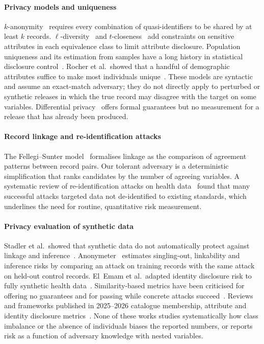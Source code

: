 \documentclass[preprint,12pt]{elsarticle}
\begin{document}
\paragraph{Privacy models and uniqueness}
$k$-anonymity~\cite{sweeney2002kanon} requires every combination of quasi-identifiers to be shared by at least $k$ records. $\ell$-diversity~\cite{machanavajjhala2007ldiv} and $t$-closeness~\cite{li2007tcloseness} add constraints on sensitive attributes in each equivalence class to limit attribute disclosure. Population uniqueness and its estimation from samples have a long history in statistical disclosure control~\cite{skinner2002measure}. Rocher et al.\ showed that a handful of demographic attributes suffice to make most individuals unique~\cite{rocher2019estimating}. These models are syntactic and assume an exact-match adversary; they do not directly apply to perturbed or synthetic releases in which the true record may disagree with the target on some variables. Differential privacy~\cite{dwork2006dp} offers formal guarantees but no measurement for a release that has already been produced.

\paragraph{Record linkage and re-identification attacks}
The Fellegi--Sunter model~\cite{fellegi1969linkage} formalises linkage as the comparison of agreement patterns between record pairs. Our tolerant adversary is a deterministic simplification that ranks candidates by the number of agreeing variables. A systematic review of re-identification attacks on health data~\cite{elemam2011review} found that many successful attacks targeted data not de-identified to existing standards, which underlines the need for routine, quantitative risk measurement.

\paragraph{Privacy evaluation of synthetic data}
Stadler et al.\ showed that synthetic data do not automatically protect against linkage and inference~\cite{stadler2022groundhog}. Anonymeter~\cite{giomi2023anonymeter} estimates singling-out, linkability and inference risks by comparing an attack on training records with the same attack on held-out control records. El~Emam et al.\ adapted identity disclosure risk to fully synthetic health data~\cite{elemam2020synthetic}. Similarity-based metrics have been criticised for offering no guarantees and for passing while concrete attacks succeed~\cite{ganev2025inadequacy,yao2025dcr}. Reviews and frameworks published in 2025--2026 catalogue membership, attribute and identity disclosure metrics~\cite{steier2025metrics,pilgram2025consensus,hu2026synqp,pathak2026kde,plasencia2025empirical}. None of these works studies systematically how class imbalance or the absence of individuals biases the reported numbers, or reports risk as a function of adversary knowledge with nested variables.
\end{document}
